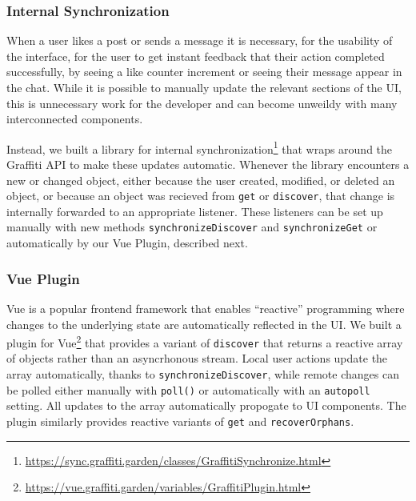 \subsubsection{Internal Synchronization}

When a user likes a post or sends a message
it is necessary, for the usability of the interface, for the user
to get instant feedback that their action completed
successfully, by seeing a like counter increment or seeing their message
appear in the chat.
While it is possible to manually update the relevant sections of the UI,
this is unnecessary work for the developer and
can become unweildy with many interconnected components.

Instead, we built a library for internal synchronization\footnote{
  \url{https://sync.graffiti.garden/classes/GraffitiSynchronize.html}
} that wraps around the Graffiti API to make these updates automatic.
Whenever the library encounters a new or changed object, either because
the user created, modified, or deleted an object,
or because an object was recieved from \texttt{get}
or \texttt{discover}, that change is internally forwarded to an
appropriate listener.
These listeners can be set up manually with new methods \texttt{synchronizeDiscover}
and \texttt{synchronizeGet} or automatically by our Vue Plugin, described next.







\subsubsection{Vue Plugin}

Vue is a popular frontend framework that enables ``reactive'' programming where
changes to the underlying state are automatically reflected in the UI.
We built a plugin for Vue\footnote{
  \url{https://vue.graffiti.garden/variables/GraffitiPlugin.html}
}
that provides a variant of
\texttt{discover} that returns a reactive array of objects rather than
an asyncrhonous stream.
Local user actions update the array automatically, thanks to
\texttt{synchronizeDiscover}, while remote changes
can be polled either manually with \texttt{poll()} or automatically
with an \texttt{autopoll} setting.
All updates to the array automatically propogate to UI components.
The plugin similarly provides reactive variants of \texttt{get} and
\texttt{recoverOrphans}.

